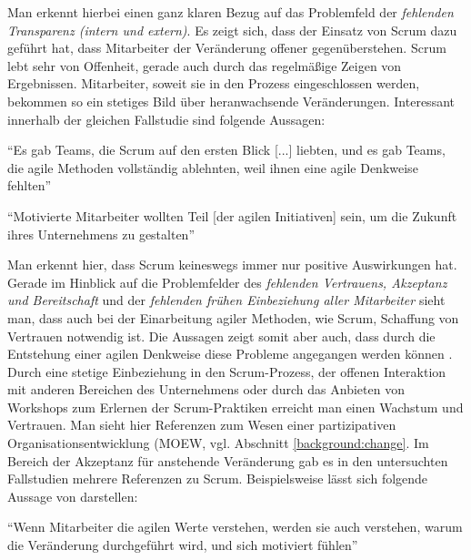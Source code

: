 Man erkennt hierbei einen ganz klaren Bezug auf das Problemfeld der \textit{fehlenden Transparenz (intern und extern)}. Es zeigt sich, dass der Einsatz von Scrum dazu geführt hat, dass Mitarbeiter der Veränderung offener gegenüberstehen. Scrum lebt sehr von Offenheit, gerade auch durch das regelmäßige Zeigen von Ergebnissen. Mitarbeiter, soweit sie in den Prozess eingeschlossen werden, bekommen so ein stetiges Bild über heranwachsende Veränderungen. Interessant innerhalb der gleichen Fallstudie sind folgende Aussagen:


\begin{center}
	``Es gab Teams, die Scrum auf den ersten Blick [...] liebten, und es gab Teams, die agile Methoden vollständig ablehnten, weil ihnen eine agile Denkweise fehlten'' \cite[S. 5]{fuchs_adapting_2019}
\end{center}

\begin{center}
	 ``Motivierte Mitarbeiter wollten Teil [der agilen Initiativen] sein, um die Zukunft ihres Unternehmens zu gestalten'' \cite[S. 7]{fuchs_adapting_2019}
\end{center}


Man erkennt hier, dass Scrum keineswegs immer nur positive Auswirkungen hat. Gerade im Hinblick auf die Problemfelder des \textit{fehlenden Vertrauens, Akzeptanz und Bereitschaft} und der \textit{fehlenden frühen Einbeziehung aller Mitarbeiter} sieht man, dass auch bei der  Einarbeitung agiler Methoden, wie Scrum, Schaffung von Vertrauen notwendig ist. Die Aussagen zeigt somit aber auch, dass durch die Entstehung einer agilen Denkweise diese Probleme angegangen werden können \cite{hofert_agile_2018}. Durch eine stetige Einbeziehung in den Scrum-Prozess, der offenen Interaktion mit anderen Bereichen des Unternehmens oder durch das Anbieten von Workshops zum Erlernen der Scrum-Praktiken erreicht man einen Wachstum und Vertrauen. Man sieht hier Referenzen zum Wesen einer partizipativen Organisationsentwicklung (MOEW, vgl. Abschnitt \ref{background:change}. Im Bereich der Akzeptanz für anstehende Veränderung gab es in den untersuchten Fallstudien mehrere Referenzen zu Scrum. Beispielsweise lässt sich folgende Aussage von  darstellen:

\begin{center}
	``Wenn Mitarbeiter die agilen Werte verstehen, werden sie auch verstehen, warum die Veränderung durchgeführt wird, und sich motiviert fühlen'' \cite[S. 17]{dikert_challenges_2016}
\end{center}

